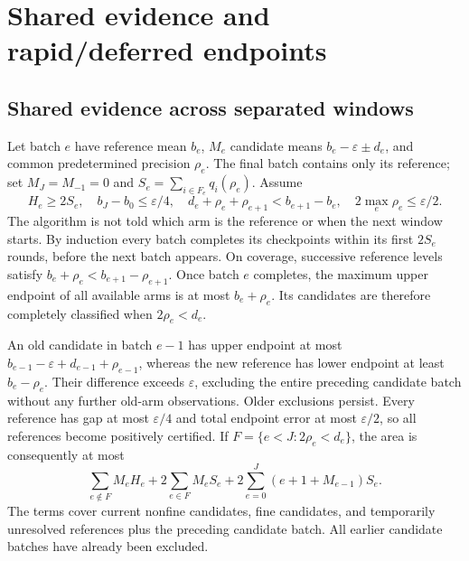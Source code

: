 \section{Shared evidence and rapid/deferred endpoints}
\label{app:reuse}

\subsection{Shared evidence across separated windows}
Let batch $e$ have reference mean $b_e$, $M_e$ candidate means
$b_e-\varepsilon\pm d_e$, and common predetermined precision $\rho_e$.
The final batch contains only its reference; set $M_J=M_{-1}=0$ and
$S_e=\sum_{i\in F_e}q_i(\rho_e)$. Assume
\[
 H_e\ge2S_e,\quad b_J-b_0\le\varepsilon/4,\quad
 d_e+\rho_e+\rho_{e+1}<b_{e+1}-b_e,\quad
 2\max_e\rho_e\le\varepsilon/2.
\]
The algorithm is not told which arm is the reference or when the next window
starts. By induction every batch completes its checkpoints within its first
$2S_e$ rounds, before the next batch appears. On coverage, successive
reference levels satisfy $b_e+\rho_e<b_{e+1}-\rho_{e+1}$. Once batch $e$
completes, the maximum upper endpoint of all available arms is at most
$b_e+\rho_e$. Its candidates are therefore completely classified when
$2\rho_e<d_e$.

An old candidate in batch $e-1$ has upper endpoint at most
$b_{e-1}-\varepsilon+d_{e-1}+\rho_{e-1}$, whereas the new reference has
lower endpoint at least $b_e-\rho_e$. Their difference exceeds
$\varepsilon$, excluding the entire preceding candidate batch without any
further old-arm observations. Older exclusions persist. Every reference has
gap at most $\varepsilon/4$ and total endpoint error at most
$\varepsilon/2$, so all references become positively certified.
If $F=\{e<J:2\rho_e<d_e\}$, the area is consequently at most
\[
 \sum_{e\notin F}M_eH_e+2\sum_{e\in F}M_eS_e+
                2\sum_{e=0}^J(e+1+M_{e-1})S_e.
\]
The terms cover current nonfine candidates, fine candidates, and temporarily
unresolved references plus the preceding candidate batch. All earlier
candidate batches have already been excluded.

